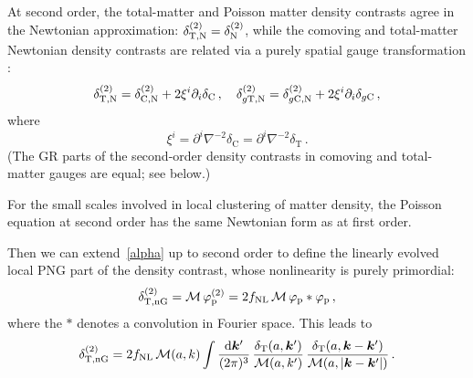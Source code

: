 { 
At second order, the total-matter and Poisson matter density contrasts agree in the Newtonian approximation: 
$\delta_{\mathrm{T,N}}^{{(2)}}=\delta^{{(2)}}_{\mathrm{N}}$, while the comoving and total-matter Newtonian density contrasts are related via a purely spatial gauge transformation \cite{Bertacca:2015mca,Villa:2015ppa, Jolicoeur:2017nyt,Umeh:2019qyd}: 
\begin{equation} \label{ttc2}
{\delta_{\mathrm{T,N}}^{{(2)}}} = {\delta_{\mathrm{C,N}}^{{(2)}}}+2\xi^i\partial_i \delta_{{\mathrm{C}}} \,,\quad {\delta_{g\mathrm{T,N}}^{{(2)}}} = {\delta_{g\mathrm{C,N}}^{{(2)}}}+2\xi^i\partial_i \delta_{{g\mathrm{C}}} \,, 
\end{equation}
where
\begin{equation} \label{xi}
\xi^i = \partial^i \nabla^{-2}\delta_{{\mathrm{C}}} = \partial^i \nabla^{-2}\delta_{{\mathrm{T}}} \,.
\end{equation}
(The GR parts of the second-order density contrasts in comoving and total-matter gauges are equal; see below.)

{For the small scales involved in local clustering of matter density, the Poisson equation at second order has the same Newtonian form as at first order.
 {Then we can extend~\eqref{alpha} up to second order to define the linearly evolved local PNG part of the density contrast, whose nonlinearity is purely primordial: 
\begin{equation} \label{alpha1a}
\delta_{\mathrm{T,nG}}^{{(2)}}={\cal M} \,\varphi_{\mathrm{p}}^{(2)} = 2f_\text{NL}  \,{\cal M} \,\varphi_{\mathrm{p}}*\varphi_{\mathrm{p}}\,,
\end{equation}
where the $*$ denotes a convolution in Fourier space.
This leads to
\begin{equation} \label{alpha2}
\delta_{\mathrm{T,nG}}^{{(2)}}= 2f_\text{NL} \,{\cal M} (a,k)\int \frac{\mathrm{d} \bm {k}'}{(2\pi)^3}\, \frac{\delta_{\mathrm{T}}(a,\bm {k}')}{{\cal M} (a,k')}\, \frac{\delta_{\mathrm{T}}(a,\bm {k}-\bm {k}')}{{\cal M} (a,|\bm {k}-\bm {k}'|)}\,.
\end{equation}

}}}
